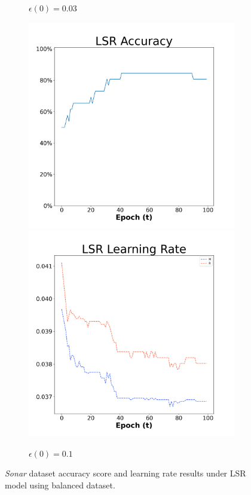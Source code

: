 \begin{figure}[H]
\begin{subfigure}{0.3\textwidth}
  \caption{$\epsilon(0)=0.03$}
\end{subfigure}\hfil %
\begin{subfigure}{0.3\textwidth}
  \includegraphics[width=\linewidth]{images/exper1/Sonar/LSR_0.1_acc.png}
  \includegraphics[width=\linewidth]{images/exper1/Sonar/LSR_0.1_lr.png}
  \caption{$\epsilon(0)=0.1$}
\end{subfigure}

\caption{\textit{Sonar} dataset accuracy score and learning rate results under LSR model using balanced dataset.}
\end{figure}

